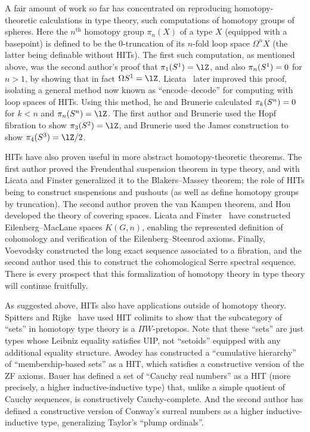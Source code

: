 \documentclass{amsart}
\begin{document}
A fair amount of work so far has concentrated on reproducing homotopy-theoretic calculations in type theory, such computations of homotopy groups of spheres.
Here the $n^{\mathrm{th}}$ homotopy group $\pi_n(X)$ of a type $X$ (equipped with a basepoint) is defined to be the $0$-truncation of its $n$-fold loop space $\Omega^n X$ (the latter being definable without HITs).
The first such computation, as mentioned above, was the second author's proof that $\pi_1(\circtype)=\lZ$, and also $\pi_n(S^1)=0$ for $n>1$, by showing that in fact $\Omega \circtype = \lZ$.
Licata~\cite{ls:pi1s1} later improved this proof, isolating a general method now known as ``encode--decode'' for computing with loop spaces of HITs.
Using this method, he and Brunerie calculated $\pi_k(S^{n}) = 0$ for $k<n$ and $\pi_n(\spheretype n) = \lZ$.
The first author and Brunerie used the Hopf fibration to show $\pi_3(\spheretype 2) = \lZ$, and Brunerie used the James construction to show $\pi_4(\spheretype 3) = \lZ/2$.

HITs have also proven useful in more abstract homotopy-theoretic theorems.
The first author proved the Freudenthal suspension theorem in type theory, and with Licata and Finster generalized it to the Blakers--Massey theorem; the role of HITs being to construct suspensions and pushouts (as well as define homotopy groups by truncation).
The second author proven the van Kampen theorem, and Hou developed the theory of covering spaces.
Licata and Finster~\cite{lf:emspaces} have constructed Eilenberg--MacLane spaces $K(G,n)$, enabling the represented definition of cohomology and verification of the Eilenberg--Steenrod axioms.
Finally, Voevodsky constructed the long exact sequence associated to a fibration, and the second author used this to construct the cohomological Serre spectral sequence.
There is every prospect that this formalization of homotopy theory in type theory will continue fruitfully.

As suggested above, HITs also have applications outside of homotopy theory.
Spitters and Rijke~\cite{rs:hottsets} have used HIT colimits to show that the subcategory of ``sets'' in homotopy type theory is a $\Pi W$-pretopos.
Note that these ``sets'' are just types whose Leibniz equality satisfies UIP, not ``setoids'' equipped with any additional equality structure.
Awodey has constructed a ``cumulative hierarchy'' of ``membership-based sets'' as a HIT, which satisfies a constructive version of the ZF axioms.
Bauer has defined a set of ``Cauchy real numbers'' as a HIT (more precisely, a higher inductive-inductive type) that, unlike a simple quotient of Cauchy sequences, is constructively Cauchy-complete.
And the second author has defined a constructive version of Conway's surreal numbers as a higher inductive-inductive type, generalizing Taylor's ``plump ordinals''.
\end{document}
